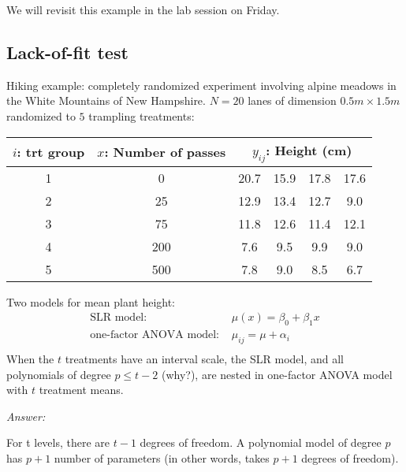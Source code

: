 We will revisit this example in the lab session on Friday.

\subsection*{Lack-of-fit test}

Hiking example: completely randomized experiment involving alpine meadows in the White Mountains of New Hampshire.
$N = 20$ lanes of dimension $0.5m \times 1.5m$ randomized to $5$ trampling treatments:
\begin{table}[H]
	\renewcommand{\arraystretch}{1.5}
	\centering
	\begin{tabular}{c|c|cccc}
		\toprule
		$i$: trt group & $x$: Number of passes & \multicolumn{4}{c}{$y_{ij}$: Height (cm)}\\
		\hline
		1 & 0 & 20.7 & 15.9 & 17.8 & 17.6\\
		2 & 25 & 12.9 & 13.4 & 12.7 & 9.0\\
		3 & 75 & 11.8 & 12.6 & 11.4 & 12.1\\
		4 & 200 & 7.6 & 9.5 & 9.9 & 9.0\\
		5 & 500 & 7.8 & 9.0 & 8.5 & 6.7\\								
		\bottomrule
	\end{tabular}
\end{table}

Two models for mean plant height:
$$
\begin{aligned}
	\mbox{SLR model: }& \mu(x) = \beta_0 + \beta_1 x\\
	\mbox{one-factor ANOVA model: }& \mu_{ij} = \mu + \alpha_i\\
\end{aligned}
$$
When the $t$ treatments have an interval scale, the SLR model, and all polynomials of degree $p\le t-2$ (why?), are nested in one-factor ANOVA model with $t$ treatment means.

{\it Answer: }\\
\begin{pf}
	For t levels, there are $t - 1$ degrees of freedom.  A polynomial model of degree $p$ has $p + 1$ number of parameters (in other words, takes $p+1$ degrees of freedom).
\end{pf}

